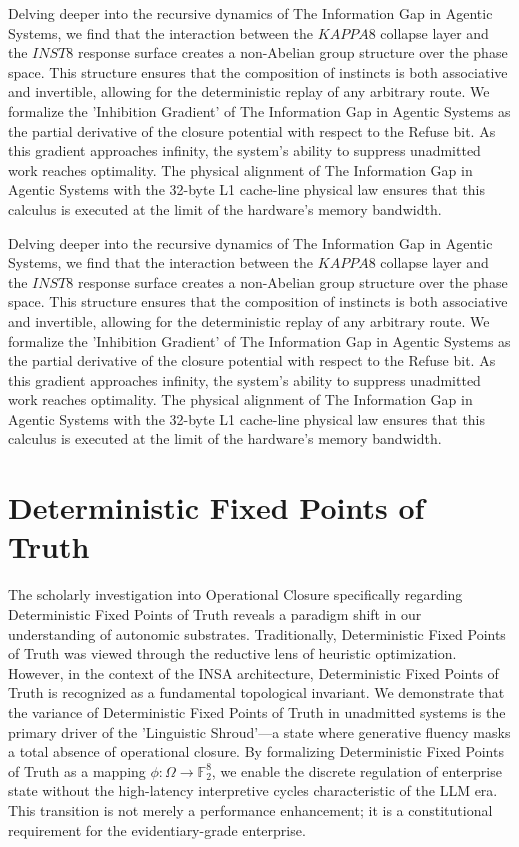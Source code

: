 \documentclass[12pt,a4paper,oneside]{book}
\begin{document}
Delving deeper into the recursive dynamics of The Information Gap in Agentic Systems, we find that the interaction between the $KAPPA8$ collapse layer and the $INST8$ response surface creates a non-Abelian group structure over the phase space. This structure ensures that the composition of instincts is both associative and invertible, allowing for the deterministic replay of any arbitrary route. We formalize the 'Inhibition Gradient' of The Information Gap in Agentic Systems as the partial derivative of the closure potential with respect to the Refuse bit. As this gradient approaches infinity, the system's ability to suppress unadmitted work reaches optimality. The physical alignment of The Information Gap in Agentic Systems with the 32-byte L1 cache-line physical law ensures that this calculus is executed at the limit of the hardware's memory bandwidth. 

Delving deeper into the recursive dynamics of The Information Gap in Agentic Systems, we find that the interaction between the $KAPPA8$ collapse layer and the $INST8$ response surface creates a non-Abelian group structure over the phase space. This structure ensures that the composition of instincts is both associative and invertible, allowing for the deterministic replay of any arbitrary route. We formalize the 'Inhibition Gradient' of The Information Gap in Agentic Systems as the partial derivative of the closure potential with respect to the Refuse bit. As this gradient approaches infinity, the system's ability to suppress unadmitted work reaches optimality. The physical alignment of The Information Gap in Agentic Systems with the 32-byte L1 cache-line physical law ensures that this calculus is executed at the limit of the hardware's memory bandwidth. 

\section{Deterministic Fixed Points of Truth}
The scholarly investigation into Operational Closure specifically regarding Deterministic Fixed Points of Truth reveals a paradigm shift in our understanding of autonomic substrates. Traditionally, Deterministic Fixed Points of Truth was viewed through the reductive lens of heuristic optimization. However, in the context of the INSA architecture, Deterministic Fixed Points of Truth is recognized as a fundamental topological invariant. We demonstrate that the variance of Deterministic Fixed Points of Truth in unadmitted systems is the primary driver of the 'Linguistic Shroud'---a state where generative fluency masks a total absence of operational closure. By formalizing Deterministic Fixed Points of Truth as a mapping $\phi: \Omega \to \mathbb{F}_2^8$, we enable the discrete regulation of enterprise state without the high-latency interpretive cycles characteristic of the LLM era. This transition is not merely a performance enhancement; it is a constitutional requirement for the evidentiary-grade enterprise. 
\end{document}
